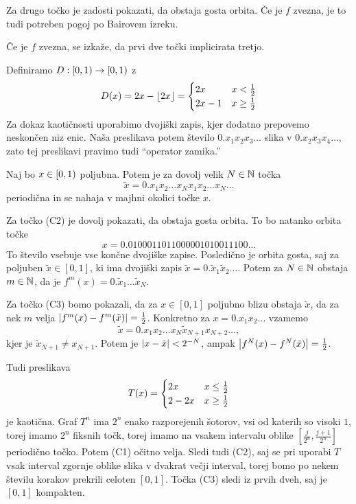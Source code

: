 \begin{opomba}
  Za drugo točko je zadosti pokazati, da obstaja gosta orbita.
  Če je $f$ zvezna, je to tudi potreben pogoj po Bairovem izreku.
\end{opomba}

\begin{opomba}
  Če je $f$ zvezna, se izkaže, da prvi dve točki implicirata tretjo.
\end{opomba}

\begin{primer}
  Definiramo $D: \left[0,1\right) \to \left[0,1\right)$ z
  \[
	D(x) = 2x - \lfloor 2x \rfloor
	=
	\begin{cases}
	  2x & x < \frac{1}{2} \\
	  2x-1 & x \ge \frac{1}{2}
	\end{cases}
  \]
  Za dokaz kaotičnosti uporabimo dvojiški zapis, kjer dodatno prepovemo
  neskončen niz enic.
  Naša preslikava potem število $0.x_1 x_2 x_3 \ldots$ slika v $0.x_2 x_3 x_4
  \ldots$, zato tej preslikavi pravimo tudi \enquote{operator zamika.}

  Naj bo $x \in \left[0,1\right)$ poljubna.
  Potem je za dovolj velik $N \in \mathbb{N}$ točka
  \[
	\tilde{x} = 0. x_1 x_2 \ldots x_N x_1 x_2 \ldots x_N \ldots
  \]
  periodična in se nahaja v majhni okolici točke $x$.

  Za točko (C2) je dovolj pokazati, da obstaja gosta orbita.
  To bo natanko orbita točke
  \[
	x = 0.0100011011000001010011100\ldots
  \]
  To število vsebuje vse končne dvojiške zapise.
  Posledično je orbita gosta, saj za poljuben $\tilde{x} \in [0,1]$, ki ima
  dvojiški zapis $\tilde{x} = 0.\tilde{x}_1 \tilde{x}_2 \ldots$.
  Potem za $N \in \mathbb{N}$ obstaja $m \in \mathbb{N}$, da je $f^m(x) = 0.\tilde{x}_1 \ldots
  \tilde{x}_N$.

  Za točko (C3) bomo pokazali, da za $x \in [0,1]$ poljubno blizu obstaja
  $\tilde{x}$, da za nek $m$ velja $\left| f^m(x) - f^m(\tilde{x}) \right| = \frac{1}{2}$.
  Konkretno za $x = 0.x_1 x_2 \ldots$ vzamemo
  \[
	\tilde{x} = 0.x_1 x_2 \ldots x_N \tilde{x}_{N+1} x_{N+2} \ldots,
  \]
  kjer je $\tilde{x}_{N+1} \ne x_{N+1}$.
  Potem je $\left| x - \tilde{x} \right| < 2^{-N}$, ampak $\left| f^N(x) -
	f^{N}(\tilde{x}) \right| = \frac{1}{2}$.
  \boxdot{}
\end{primer}

\begin{primer}
  Tudi preslikava
  \[
	T(x) =
	\begin{cases}
	  2x & x \le \frac{1}{2} \\
	  2 - 2x & x \ge \frac{1}{2}
	\end{cases}
  \]
  je kaotična.
  Graf $T^n$ ima $2^n$ enako razporejenih šotorov, vsi od katerih so visoki
  $1$, torej imamo $2^n$ fiksnih točk, torej imamo na vsakem intervalu oblike
  $[\frac{j}{2^n}, \frac{j+1}{2^n}]$ periodično točko.
  Potem (C1) očitno velja.
  Sledi tudi (C2), saj se pri uporabi $T$ vsak interval zgornje oblike slika v
  dvakrat večji interval, torej bomo po nekem številu korakov prekrili celoten
  $[0,1]$.
  Točka (C3) sledi iz prvih dveh, saj je $[0,1]$ kompakten.
\end{primer}

